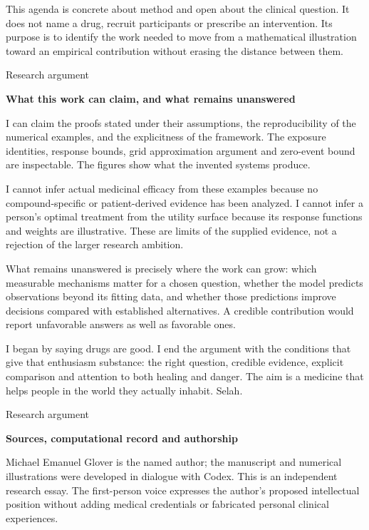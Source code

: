 \documentclass[10pt]{article}
\begin{document}
This agenda is concrete about method and open about the clinical question. It does not name a drug, recruit participants or prescribe an intervention. Its purpose is to identify the work needed to move from a mathematical illustration toward an empirical contribution without erasing the distance between them.\par
\clearpage
{\small\color{accent}Research argument}\par
{\LARGE\bfseries\color{ink}What this work can claim, and what remains unanswered}\par\vspace{7pt}
I can claim the proofs stated under their assumptions, the reproducibility of the numerical examples, and the explicitness of the framework. The exposure identities, response bounds, grid approximation argument and zero-event bound are inspectable. The figures show what the invented systems produce.\par
I cannot infer actual medicinal efficacy from these examples because no compound-specific or patient-derived evidence has been analyzed. I cannot infer a person's optimal treatment from the utility surface because its response functions and weights are illustrative. These are limits of the supplied evidence, not a rejection of the larger research ambition.\par
What remains unanswered is precisely where the work can grow: which measurable mechanisms matter for a chosen question, whether the model predicts observations beyond its fitting data, and whether those predictions improve decisions compared with established alternatives. A credible contribution would report unfavorable answers as well as favorable ones.\par
I began by saying drugs are good. I end the argument with the conditions that give that enthusiasm substance: the right question, credible evidence, explicit comparison and attention to both healing and danger. The aim is a medicine that helps people in the world they actually inhabit. Selah.\par
\clearpage
{\small\color{accent}Research argument}\par
{\LARGE\bfseries\color{ink}Sources, computational record and authorship}\par\vspace{7pt}
Michael Emanuel Glover is the named author; the manuscript and numerical illustrations were developed in dialogue with Codex. This is an independent research essay. The first-person voice expresses the author's proposed intellectual position without adding medical credentials or fabricated personal clinical experiences.\par
\end{document}
